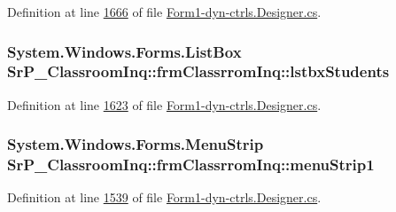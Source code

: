 \-Definition at line \hyperlink{_form1-dyn-ctrls_8_designer_8cs_source_l01666}{1666} of file \hyperlink{_form1-dyn-ctrls_8_designer_8cs_source}{\-Form1-\/dyn-\/ctrls.\-Designer.\-cs}.

\hypertarget{class_sr_p___classroom_inq_1_1frm_classrrom_inq_a0c67f5e900e579981b753ac9853a5141}{
\subsubsection[{lstbx\-Students}]{\setlength{\rightskip}{0pt plus 5cm}\-System.\-Windows.\-Forms.\-List\-Box {\bf \-Sr\-P\-\_\-\-Classroom\-Inq\-::frm\-Classrrom\-Inq\-::lstbx\-Students}}}
\label{class_sr_p___classroom_inq_1_1frm_classrrom_inq_a0c67f5e900e579981b753ac9853a5141}


\-Definition at line \hyperlink{_form1-dyn-ctrls_8_designer_8cs_source_l01623}{1623} of file \hyperlink{_form1-dyn-ctrls_8_designer_8cs_source}{\-Form1-\/dyn-\/ctrls.\-Designer.\-cs}.

\hypertarget{class_sr_p___classroom_inq_1_1frm_classrrom_inq_a549704b03b13cfbb5cbc07c18c0c600a}{
\subsubsection[{menu\-Strip1}]{\setlength{\rightskip}{0pt plus 5cm}\-System.\-Windows.\-Forms.\-Menu\-Strip {\bf \-Sr\-P\-\_\-\-Classroom\-Inq\-::frm\-Classrrom\-Inq\-::menu\-Strip1}}}
\label{class_sr_p___classroom_inq_1_1frm_classrrom_inq_a549704b03b13cfbb5cbc07c18c0c600a}


\-Definition at line \hyperlink{_form1-dyn-ctrls_8_designer_8cs_source_l01539}{1539} of file \hyperlink{_form1-dyn-ctrls_8_designer_8cs_source}{\-Form1-\/dyn-\/ctrls.\-Designer.\-cs}.

